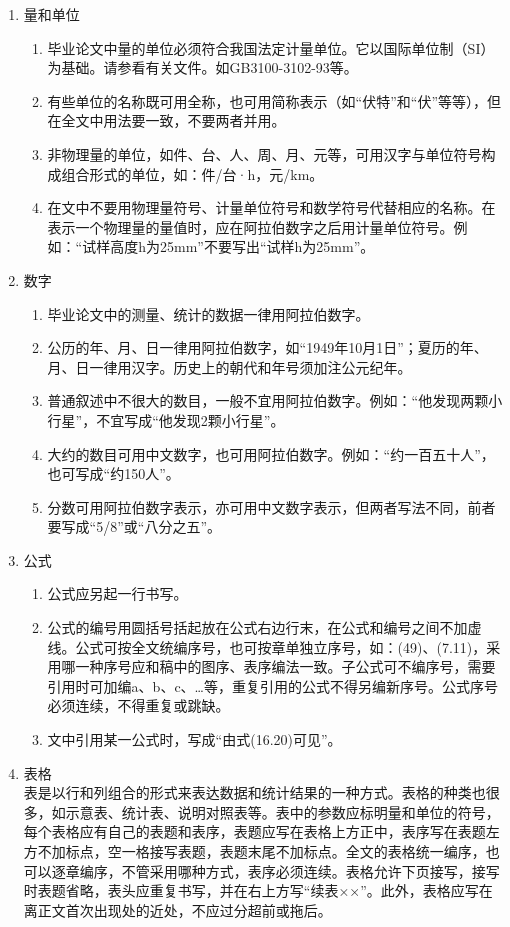 \documentclass{HDU-Bachelor-Thesis}
\begin{document}
\begin{enumerate}
    \item 量和单位
    \begin{enumerate}
        \item 毕业论文中量的单位必须符合我国法定计量单位。它以国际单位制（SI）为基础。请参看有关文件。如GB3100-3102-93等。
        \item 有些单位的名称既可用全称，也可用简称表示（如“伏特”和“伏”等等），但在全文中用法要一致，不要两者并用。
        \item 非物理量的单位，如件、台、人、周、月、元等，可用汉字与单位符号构成组合形式的单位，如：件/台·h，元/km。
        \item 在文中不要用物理量符号、计量单位符号和数学符号代替相应的名称。在表示一个物理量的量值时，应在阿拉伯数字之后用计量单位符号。例如：“试样高度h为25mm”不要写出“试样h为25mm”。
    \end{enumerate}

    \item 数字
    \begin{enumerate}
        \item 毕业论文中的测量、统计的数据一律用阿拉伯数字。
        \item 公历的年、月、日一律用阿拉伯数字，如“1949年10月1日”；夏历的年、月、日一律用汉字。历史上的朝代和年号须加注公元纪年。
        \item 普通叙述中不很大的数目，一般不宜用阿拉伯数字。例如：“他发现两颗小行星”，不宜写成“他发现2颗小行星”。
        \item 大约的数目可用中文数字，也可用阿拉伯数字。例如：“约一百五十人”，也可写成“约150人”。
        \item 分数可用阿拉伯数字表示，亦可用中文数字表示，但两者写法不同，前者要写成“5/8”或“八分之五”。
    \end{enumerate}

    \item 公式
    \begin{enumerate}
        \item 公式应另起一行书写。
        \item 公式的编号用圆括号括起放在公式右边行末，在公式和编号之间不加虚线。公式可按全文统编序号，也可按章单独立序号，如：(49)、(7.11)，采用哪一种序号应和稿中的图序、表序编法一致。子公式可不编序号，需要引用时可加编a、b、c、…等，重复引用的公式不得另编新序号。公式序号必须连续，不得重复或跳缺。
        \item 文中引用某一公式时，写成“由式(16.20)可见”。
    \end{enumerate}

    \item 表格\\
    表是以行和列组合的形式来表达数据和统计结果的一种方式。表格的种类也很多，如示意表、统计表、说明对照表等。表中的参数应标明量和单位的符号，每个表格应有自己的表题和表序，表题应写在表格上方正中，表序写在表题左方不加标点，空一格接写表题，表题末尾不加标点。全文的表格统一编序，也可以逐章编序，不管采用哪种方式，表序必须连续。表格允许下页接写，接写时表题省略，表头应重复书写，并在右上方写“续表××”。此外，表格应写在离正文首次出现处的近处，不应过分超前或拖后。


\end{enumerate}
\end{document}
